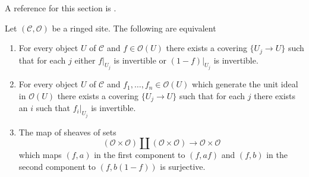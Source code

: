 \noindent
A reference for this section is
\cite[Expose IV, Exercise 13.9]{SGA4}.

\begin{lemma}
\label{lemma-locally-ringed}
Let $(\mathcal{C}, \mathcal{O})$ be a ringed site. The following
are equivalent
\begin{enumerate}
\item For every object $U$ of $\mathcal{C}$ and $f \in \mathcal{O}(U)$
there exists a covering $\{U_j \to U\}$ such that for each $j$
either $f|_{U_j}$ is invertible or $(1 - f)|_{U_j}$ is invertible.
\item For every object $U$ of $\mathcal{C}$ and
$f_1, \ldots, f_n \in \mathcal{O}(U)$ which generate the unit ideal
in $\mathcal{O}(U)$  there exists a covering $\{U_j \to U\}$
such that for each $j$ there exists an $i$ such that $f_i|_{U_j}$
is invertible.
\item The map of sheaves of sets
$$
(\mathcal{O} \times \mathcal{O})
\amalg
(\mathcal{O} \times \mathcal{O})
\longrightarrow
\mathcal{O} \times \mathcal{O}
$$
which maps $(f, a)$ in the first component to $(f, af)$ and
$(f, b)$ in the second component to $(f, b(1 - f))$ is surjective.
\end{enumerate}
\end{lemma}

